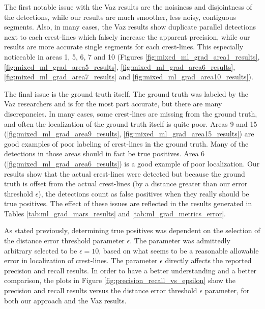 The first notable issue with the Vaz results are the noisiness and disjointness of the detections, while our results are much smoother, less noisy, contiguous segments. Also, in many cases, the Vaz results show duplicate parallel detections next to each crest-lines which falsely increase the apparent precision, while our results are more accurate single segments for each crest-lines. This especially noticeable in areas 1, 5, 6, 7 and 10 (Figures \ref{fig:mixed_ml_grad_area1_results}, \ref{fig:mixed_ml_grad_area5_results}, \ref{fig:mixed_ml_grad_area6_results}, \ref{fig:mixed_ml_grad_area7_results} and \ref{fig:mixed_ml_grad_area10_results}).

The final issue is the ground truth itself. The ground truth was labeled by the Vaz researchers and is for the most part accurate, but there are many discrepancies. In many cases, some crest-lines are missing from the ground truth, and often the localization of the ground truth itself is quite poor. Areas 9 and 15 (\ref{fig:mixed_ml_grad_area9_results}, \ref{fig:mixed_ml_grad_area15_results}) are good examples of poor labeling of crest-lines in the ground truth. Many of the detections in those areas should in fact be true positives. Area 6 (\ref{fig:mixed_ml_grad_area6_results}) is a good example of poor localization. Our results show that the actual crest-lines were detected but because the ground truth is offset from the actual crest-lines (by a distance greater than our error threshold $\epsilon$), the detections count as false positives when they really should be true positives. The effect of these issues are reflected in the results generated in Tables \ref{tab:ml_grad_mars_results} and \ref{tab:ml_grad_metrics_error}.

As stated previously, determining true positives was dependent on the selection of the distance error threshold parameter $\epsilon$. The parameter was admittedly arbitrary selected to be $\epsilon = 10$, based on what seems to be a reasonable allowable error in localization of crest-lines. The parameter $\epsilon$ directly affects the reported precision and recall results. In order to have a better understanding and a better comparison, the plots in Figure \ref{fig:precision_recall_vs_epsilon} show the precision and recall results versus the distance error threshold $\epsilon$ parameter, for both our approach and the Vaz results.

